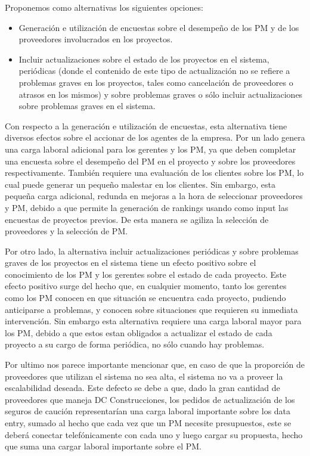 Proponemos como alternativas los siguientes opciones:
\begin{itemize}
	\item Generación e utilización de encuestas sobre el desempeño de los PM y de los proveedores involucrados en los proyectos.
	\item Incluir actualizaciones sobre el estado de los proyectos en el sistema, periódicas (donde el contenido de este tipo de actualización no se refiere a problemas graves en los proyectos, tales como cancelación de proveedores o atrasos en los mismos) y sobre problemas graves o sólo incluir actualizaciones sobre problemas graves en el sistema.
\end{itemize}

Con respecto a la generación e utilización de encuestas, esta alternativa tiene diversos efectos sobre el accionar de los agentes de la empresa. Por un lado genera una carga laboral adicional para los gerentes y los PM, ya que deben completar una encuesta sobre el desempeño del PM en el proyecto y sobre los proveedores respectivamente. También requiere una evaluación de los clientes sobre los PM, lo cual puede generar un pequeño malestar en los clientes. Sin embargo, esta pequeña carga adicional, redunda en mejoras a la hora de seleccionar proveedores y PM, debido a que permite la generación de rankings usando como input las encuestas de proyectos previos. De esta manera se agiliza la selección de proveedores y la selección de PM.

Por otro lado, la alternativa incluir actualizaciones periódicas y sobre problemas graves de los proyectos en el sistema tiene un efecto positivo sobre el conocimiento de los PM y los gerentes sobre el estado de cada proyecto. Este efecto positivo surge del hecho que, en cualquier momento, tanto los gerentes como los PM conocen en que situación se encuentra cada proyecto, pudiendo anticiparse a problemas, y conocen sobre situaciones que requieren su inmediata intervención.
Sin embargo esta alternativa requiere una carga laboral mayor para los PM, debido a que estos estan obligados a actualizar el estado de cada proyecto a su cargo de forma periódica, no sólo cuando hay problemas.

Por ultimo nos parece importante mencionar que, en caso de que la proporción de proveedores que utilizan el sistema no sea alta, el sistema no va a proveer la escalabilidad deseada. Este defecto se debe a que, dado la gran cantidad de proveedores que maneja DC Construcciones, los pedidos de actualización de los seguros de caución representarían una carga laboral importante sobre los data entry, sumado al hecho que cada vez que un PM necesite presupuestos, este se deberá conectar telefónicamente con cada uno y luego cargar su propuesta, hecho que suma una cargar laboral importante sobre el PM.
